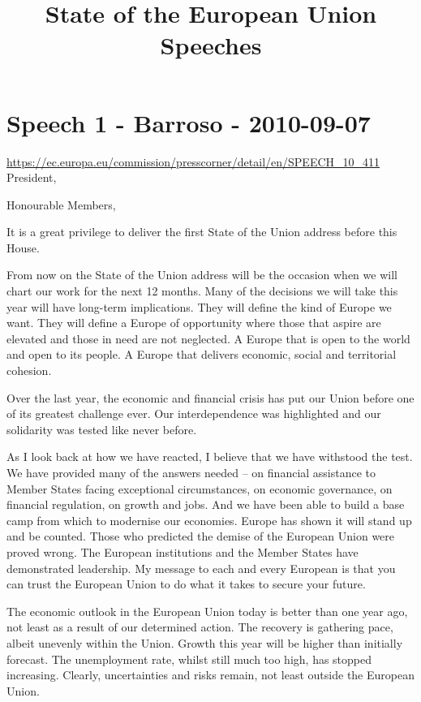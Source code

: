\documentclass[a4paper,11pt]{article}
\title{State of the European Union Speeches}
\date{}
\begin{document}
\maketitle
\tableofcontents
\newpage

\section{Speech 1 - Barroso - 2010-09-07}
\url{https://ec.europa.eu/commission/presscorner/detail/en/SPEECH_10_411}\\[3mm]
President,

Honourable Members,

It is a great privilege to deliver the first State of the Union address before this House.

From now on the State of the Union address will be the occasion when we will chart our work for the next 12 months. Many of the decisions we will take this year will have long-term implications. They will define the kind of Europe we want. They will define a Europe of opportunity where those that aspire are elevated and those in need are not neglected. A Europe that is open to the world and open to its people. A Europe that delivers economic, social and territorial cohesion.

Over the last year, the economic and financial crisis has put our Union before one of its greatest challenge ever. Our interdependence was highlighted and our solidarity was tested like never before.

As I look back at how we have reacted, I believe that we have withstood the test. We have provided many of the answers needed – on financial assistance to Member States facing exceptional circumstances, on economic governance, on financial regulation, on growth and jobs. And we have been able to build a base camp from which to modernise our economies. Europe has shown it will stand up and be counted. Those who predicted the demise of the European Union were proved wrong. The European institutions and the Member States have demonstrated leadership. My message to each and every European is that you can trust the European Union to do what it takes to secure your future.

The economic outlook in the European Union today is better than one year ago, not least as a result of our determined action. The recovery is gathering pace, albeit unevenly within the Union. Growth this year will be higher than initially forecast. The unemployment rate, whilst still much too high, has stopped increasing. Clearly, uncertainties and risks remain, not least outside the European Union.
\end{document}
